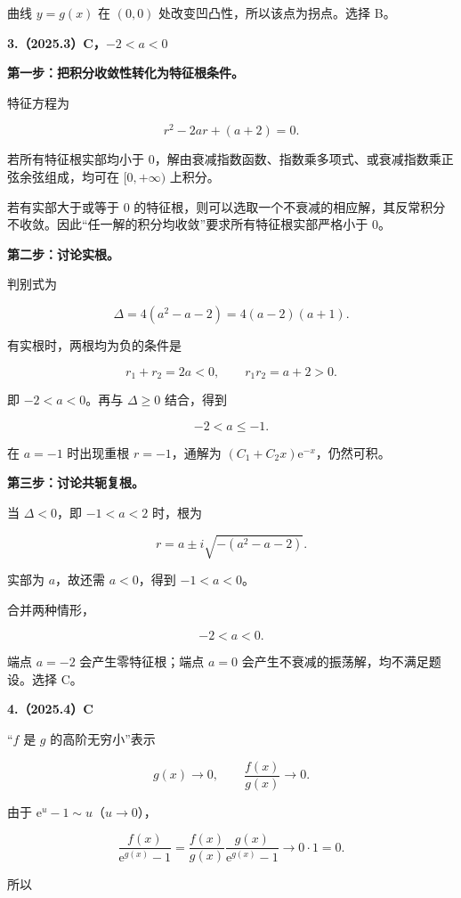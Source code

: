 \documentclass[UTF8,11pt,fontset=windows]{ctexart}
\begin{document}
曲线 $y=g(x)$ 在 $(0,0)$ 处改变凹凸性，所以该点为拐点。选择 B。

\clearpage

\textbf{3.（2025.3）C，$-2<a<0$}

\textbf{第一步：把积分收敛性转化为特征根条件。}

特征方程为

$$
r^2-2ar+(a+2)=0.
$$

若所有特征根实部均小于 $0$，解由衰减指数函数、指数乘多项式、或衰减指数乘正弦余弦组成，均可在 $[0,+\infty)$ 上积分。

若有实部大于或等于 $0$ 的特征根，则可以选取一个不衰减的相应解，其反常积分不收敛。因此“任一解的积分均收敛”要求所有特征根实部严格小于 $0$。

\textbf{第二步：讨论实根。}

判别式为

$$
\Delta=4(a^2-a-2)=4(a-2)(a+1).
$$

有实根时，两根均为负的条件是

$$
r_1+r_2=2a<0,\qquad r_1r_2=a+2>0.
$$

即 $-2<a<0$。再与 $\Delta\ge0$ 结合，得到

$$
-2<a\le-1.
$$

在 $a=-1$ 时出现重根 $r=-1$，通解为 $(C_1+C_2x)\mathrm e^{-x}$，仍然可积。

\textbf{第三步：讨论共轭复根。}

当 $\Delta<0$，即 $-1<a<2$ 时，根为

$$
r=a\pm i\sqrt{-(a^2-a-2)}.
$$

实部为 $a$，故还需 $a<0$，得到 $-1<a<0$。

合并两种情形，

$$
\boxed{-2<a<0}.
$$

端点 $a=-2$ 会产生零特征根；端点 $a=0$ 会产生不衰减的振荡解，均不满足题设。选择 C。

\clearpage

\textbf{4.（2025.4）C}

“$f$ 是 $g$ 的高阶无穷小”表示

$$
g(x)\to0,\qquad \frac{f(x)}{g(x)}\to0.
$$

由于 $\mathrm e^u-1\sim u$（$u\to0$），

$$
\frac{f(x)}{\mathrm e^{g(x)}-1}
=\frac{f(x)}{g(x)}\frac{g(x)}{\mathrm e^{g(x)}-1}
\longrightarrow0\cdot1=0.
$$

所以
\end{document}
